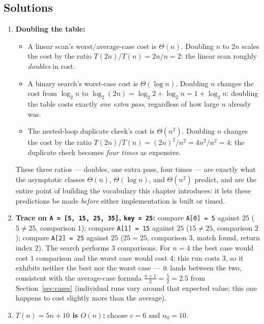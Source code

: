 \documentclass[11pt]{article}
\begin{document}
\subsection*{Solutions}

\begingroup\small
\begin{enumerate}
  \item \textbf{Doubling the table:}
    \begin{itemize}
      \item[(a)] A linear scan's worst/average-case cost is $\Theta(n)$.
        Doubling $n$ to $2n$ scales the cost by the ratio $T(2n)/T(n) =
        2n/n = 2$: the linear scan roughly \emph{doubles} in cost.
      \item[(b)] A binary search's worst-case cost is $\Theta(\log n)$.
        Doubling $n$ changes the cost from $\log_2 n$ to
        $\log_2(2n) = \log_2 2 + \log_2 n = 1 + \log_2 n$: doubling the
        table costs exactly \emph{one extra pass}, regardless of how large
        $n$ already was.
      \item[(c)] The nested-loop duplicate check's cost is $\Theta(n^2)$.
        Doubling $n$ changes the cost by the ratio $T(2n)/T(n) =
        (2n)^2/n^2 = 4n^2/n^2 = 4$: the duplicate check becomes
        \emph{four times} as expensive.
    \end{itemize}
    These three ratios --- doubles, one extra pass, four times --- are
    exactly what the asymptotic classes $\Theta(n)$, $\Theta(\log n)$, and
    $\Theta(n^2)$ predict, and are the entire point of building the
    vocabulary this chapter introduces: it lets these predictions be made
    \emph{before} either implementation is built or timed.
  \item \textbf{Trace on \texttt{A = [5, 15, 25, 35]}, \texttt{key = 25}:}
    compare \texttt{A[0] = 5} against $25$ ($5 \ne 25$, comparison $1$);
    compare \texttt{A[1] = 15} against $25$ ($15 \ne 25$, comparison $2$);
    compare \texttt{A[2] = 25} against $25$ ($25 = 25$, comparison $3$,
    match found, return index $2$). The search performs $3$ comparisons.
    For $n = 4$ the best case would cost $1$ comparison and the worst case
    would cost $4$; this run costs $3$, so it exhibits neither the best nor
    the worst case --- it lands between the two, consistent with the
    average-case formula $\frac{n+1}{2} = \frac{5}{2} = 2.5$ from
    Section~\ref{sec:cases} (individual runs vary around that expected
    value; this one happens to cost slightly more than the average).
  \item \textbf{$T(n) = 5n + 10$ is $O(n)$:} choose $c = 6$ and $n_0 = 10$.

\end{enumerate}
\end{document}
